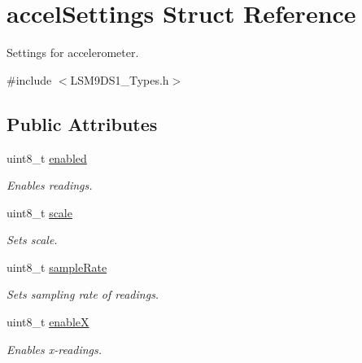 \hypertarget{structaccelSettings}{}\section{accel\+Settings Struct Reference}
\label{structaccelSettings}


Settings for accelerometer.  




{\ttfamily \#include $<$L\+S\+M9\+D\+S1\+\_\+\+Types.\+h$>$}

\subsection*{Public Attributes}
\begin{DoxyCompactItemize}
\item 
\mbox{\label{structaccelSettings_a6ecaf7abfbaf7e74c6986fd93798ad4b}} 
uint8\+\_\+t \hyperlink{structaccelSettings_a6ecaf7abfbaf7e74c6986fd93798ad4b}{enabled}
\begin{DoxyCompactList}\small\item\em Enables readings. \end{DoxyCompactList}\item 
\mbox{\label{structaccelSettings_a3a0a38e5e32ad21fcf8e880f37c0de1e}} 
uint8\+\_\+t \hyperlink{structaccelSettings_a3a0a38e5e32ad21fcf8e880f37c0de1e}{scale}
\begin{DoxyCompactList}\small\item\em Sets scale. \end{DoxyCompactList}\item 
\mbox{\label{structaccelSettings_a51704cb40f1e72ec298f601fedcc6092}} 
uint8\+\_\+t \hyperlink{structaccelSettings_a51704cb40f1e72ec298f601fedcc6092}{sample\+Rate}
\begin{DoxyCompactList}\small\item\em Sets sampling rate of readings. \end{DoxyCompactList}\item 
\mbox{\label{structaccelSettings_a8cd5546cda8657ad2405d378fc815b9a}} 
uint8\+\_\+t \hyperlink{structaccelSettings_a8cd5546cda8657ad2405d378fc815b9a}{enableX}
\begin{DoxyCompactList}\small\item\em Enables x-\/readings. \end{DoxyCompactList}\item 

\end{DoxyCompactItemize}
